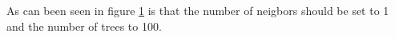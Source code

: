 \documentclass[a4paper,12pt]{article}
\begin{document}
{\begin{figure}[H]
\hfill
{}
\hfill
\caption{}
\label{Q22}
\end{figure}
As can been seen in figure \ref{Q22} is that the number of neigbors should be set to 1 and the number of trees to 100. 

}
\end{document}
